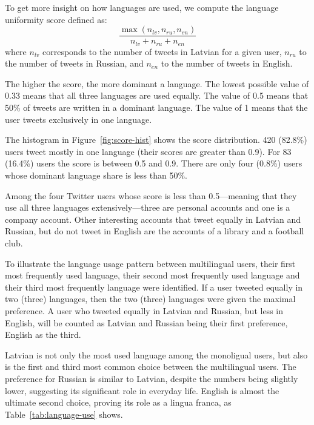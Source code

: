\documentclass[11pt,a4paper]{article}
\begin{document}
To get more insight on how languages are used, we compute the language uniformity score defined as:
\begin{equation}
  \label{eq:score}
  \frac{\max(n_\mathit{lv}, n_\mathit{ru}, n_\mathit{en})}{n_\mathit{lv} + n_\mathit{ru} + n_\mathit{en}}
\end{equation}
where $n_\mathit{lv}$ corresponds to the number of tweets in Latvian for a given user, $n_\mathit{ru}$ to the number of tweets in Russian, and $n_\mathit{en}$ to the number of tweets in English.

The higher the score, the more dominant a language. The lowest possible value of 0.33 means that all three languages are used equally. The value of 0.5 means that 50\% of tweets are written in a dominant language. The value of 1 means that the user tweets exclusively in one language.

The histogram in Figure~\ref{fig:score-hist} shows the score distribution. 420 (82.8\%) users tweet mostly in one language (their scores are greater than 0.9). For 83  (16.4\%) users the score is between 0.5 and 0.9. There are only four (0.8\%) users whose dominant language share is less than 50\%.

Among the four Twitter users whose score is less than 0.5---meaning that they use all three languages extensively---three are personal accounts and one is a company account. Other interesting accounts that tweet equally in Latvian and Russian, but do not tweet in English are the accounts of a library and a football club.

To illustrate the language usage pattern between multilingual users, their first most frequently used language, their second most frequently used language and their third most frequently language were identified. If a user tweeted equally in two (three) languages, then the two (three) languages were given the maximal preference. A user who tweeted equally in Latvian and Russian, but less in English, will be counted as Latvian and Russian being their first preference, English as the third.

Latvian is not only the most used language among the monoligual users, but also is the first and third most common choice between the multilingual users. The preference for Russian is similar to Latvian, despite the numbers being slightly lower, suggesting its significant role in everyday life. English is almost the ultimate second choice, proving its role as a lingua franca, as Table~\ref{tab:language-use} shows.
%

\end{document}
